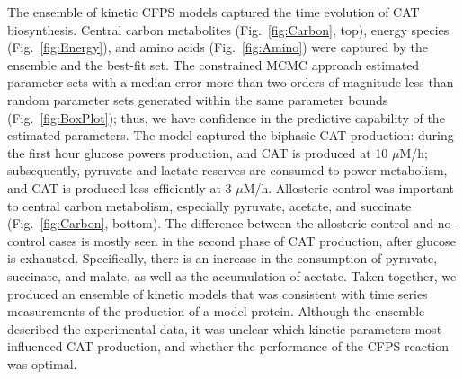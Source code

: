 \documentclass[12pt]{article}
\begin{document}
The ensemble of kinetic CFPS models captured the time evolution of CAT biosynthesis.
Central carbon metabolites (Fig.~\ref{fig:Carbon}, top), energy species (Fig.~\ref{fig:Energy}), and amino acids (Fig.~\ref{fig:Amino}) were captured by the ensemble and the best-fit set.
The constrained MCMC approach estimated parameter sets with a median error more than two orders of magnitude less than random parameter sets generated within the same parameter bounds (Fig.~\ref{fig:BoxPlot}); thus, we have confidence in the predictive capability of the estimated parameters.
The model captured the biphasic CAT production: during the first hour glucose powers production, and CAT is produced at 10 $\mu$M/h; subsequently, pyruvate and lactate reserves are consumed to power metabolism, and CAT is produced less efficiently at 3 $\mu$M/h.
Allosteric control was important to central carbon metabolism, especially pyruvate, acetate, and succinate (Fig.~\ref{fig:Carbon}, bottom).
The difference between the allosteric control and no-control cases is mostly seen in the second phase of CAT production, after glucose is exhausted.
Specifically, there is an increase in the consumption of pyruvate, succinate, and malate, as well as the accumulation of acetate.
Taken together, we produced an ensemble of kinetic models that was consistent with time series measurements of the production of a model protein.
Although the ensemble described the experimental data, it was unclear which kinetic parameters most influenced CAT production, and whether the performance of the CFPS reaction was optimal.
\end{document}

